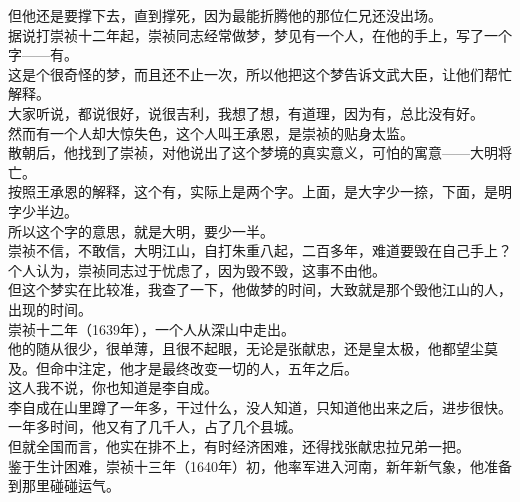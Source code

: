 \begin{multicols}{\theparacolNo}
但他还是要撑下去，直到撑死，因为最能折腾他的那位仁兄还没出场。\\

据说打崇祯十二年起，崇祯同志经常做梦，梦见有一个人，在他的手上，写了一个字——有。\\

这是个很奇怪的梦，而且还不止一次，所以他把这个梦告诉文武大臣，让他们帮忙解释。\\

大家听说，都说很好，说很吉利，我想了想，有道理，因为有，总比没有好。\\

然而有一个人却大惊失色，这个人叫王承恩，是崇祯的贴身太监。\\

散朝后，他找到了崇祯，对他说出了这个梦境的真实意义，可怕的寓意——大明将亡。\\

按照王承恩的解释，这个有，实际上是两个字。上面，是大字少一捺，下面，是明字少半边。\\

所以这个字的意思，就是大明，要少一半。\\

崇祯不信，不敢信，大明江山，自打朱重八起，二百多年，难道要毁在自己手上？\\

个人认为，崇祯同志过于忧虑了，因为毁不毁，这事不由他。\\

但这个梦实在比较准，我查了一下，他做梦的时间，大致就是那个毁他江山的人，出现的时间。\\

崇祯十二年（1639年），一个人从深山中走出。\\

他的随从很少，很单薄，且很不起眼，无论是张献忠，还是皇太极，他都望尘莫及。但命中注定，他才是最终改变一切的人，五年之后。\\

这人我不说，你也知道是李自成。\\

李自成在山里蹲了一年多，干过什么，没人知道，只知道他出来之后，进步很快。\\

一年多时间，他又有了几千人，占了几个县城。\\

但就全国而言，他实在排不上，有时经济困难，还得找张献忠拉兄弟一把。\\

鉴于生计困难，崇祯十三年（1640年）初，他率军进入河南，新年新气象，他准备到那里碰碰运气。\\


\end{multicols}
